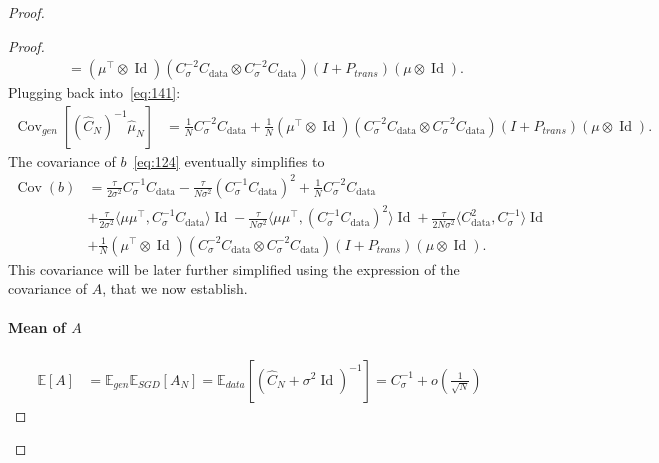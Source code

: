 \documentclass[11pt]{article}
\newcommand{\id}{\operatorname{Id}}
\newcommand{\EE}{\mathbb{E}}
\newcommand{\cov}{\operatorname{Cov}}
\begin{document}
\begin{proof}
\begin{proof}
\begin{align*}
&= (\mu^\top \otimes \id)  (C_\sigma^{-2} C_\mathrm{data} \otimes C_\sigma^{-2} C_\mathrm{data})  ( I + P_{trans})  (\mu\otimes \id). 
\end{align*}
Plugging back into~\eqref{eq:141}:
\begin{align*}
\cov_{gen}[(\hat C_N)^{-1} \hat \mu_N] &= \frac1N  C_\sigma^{-2} C_\mathrm{data}  + \frac1N (\mu^\top \otimes \id)  (C_\sigma^{-2} C_\mathrm{data} \otimes C_\sigma^{-2} C_\mathrm{data})  ( I + P_{trans})  (\mu\otimes \id).
\end{align*}
The covariance of $b$~\eqref{eq:124} eventually simplifies to
\begin{align} \label{eq:cov_b_app}
\cov(b) &= \frac{\tau}{2 \sigma^2}C_\sigma^{-1} C_\mathrm{data} - \frac{\tau}{N \sigma^2} (C_\sigma^{-1} C_\mathrm{data})^2 + \frac{1}{N}  C_\sigma^{-2}C_\mathrm{data} \\ \nonumber
&+ \frac{\tau}{2 \sigma^2} \langle \mu\mu^\top, C_\sigma^{-1} C_\mathrm{data} \rangle \id - \frac{\tau}{ N\sigma^2} \langle\mu\mu^\top,  (C_\sigma^{-1}C_\mathrm{data})^2 \rangle \id + \frac{\tau}{ 2N\sigma^2} \langle C_\mathrm{data}^2, C_\sigma^{-1} \rangle \id \\ \nonumber
&+ \frac1N (\mu^\top \otimes \id)  (C_\sigma^{-2} C_\mathrm{data} \otimes C_\sigma^{-2} C_\mathrm{data})  ( I + P_{trans})  (\mu\otimes \id).
\end{align}
This covariance will be later further simplified using the expression of the covariance of $A$, that we now establish.
\paragraph{Mean of $A$} 
\begin{align*}
    \EE[A] &=  \EE_{gen}\EE_{SGD}[A_N] = \EE_{data}[(\hat C_N + \sigma^2\id)^{-1}] = C_\sigma^{-1} + o \left( \frac{1}{\sqrt{N}} \right)
\end{align*}

\end{proof}
\end{proof}
\end{document}
